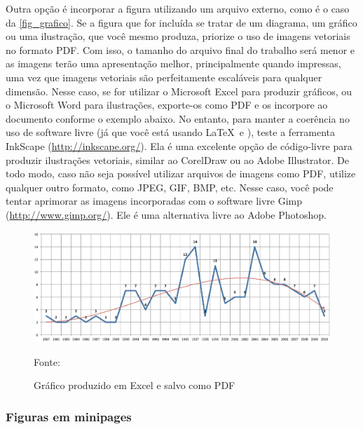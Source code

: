 Outra opção \'e incorporar a figura utilizando um arquivo externo, como \'e o caso da \autoref{fig_grafico}. Se a figura que for incluída se tratar de um diagrama, um gr\'afico ou uma ilustração, que voc\^e mesmo produza, priorize o uso de imagens vetoriais no formato PDF. Com isso, o tamanho do arquivo final do trabalho ser\'a menor e as imagens terão uma apresentação melhor, principalmente quando impressas, uma vez que imagens vetoriais são perfeitamente escal\'aveis para qualquer dimensão. Nesse caso, se for utilizar o Microsoft Excel para produzir gr\'aficos, ou o Microsoft Word para ilustrações, exporte-os como PDF e os incorpore ao documento conforme o exemplo abaixo. No entanto, para manter a
coer\^encia no uso de software livre (j\'a que voc\^e est\'a usando \LaTeX\  e \abnTeX),
teste a ferramenta \textsf{InkScape}
(\url{http://inkscape.org/}). Ela \'e uma excelente opção de código-livre para
produzir ilustrações vetoriais, similar ao CorelDraw ou ao Adobe
Illustrator. De todo modo, caso não seja possível
utilizar arquivos de imagens como PDF, utilize qualquer outro formato, como
JPEG, GIF, BMP, etc. Nesse caso, voc\^e pode tentar aprimorar as imagens
incorporadas com o software livre \textsf{Gimp}
(\url{http://www.gimp.org/}). Ele \'e uma alternativa livre ao Adobe
Photoshop. \\

\begin{figure}[H]
	\caption{\label{fig_grafico}Gr\'afico produzido em Excel e salvo como PDF}
	\includegraphics[scale=0.5]{USPSC-img/USPSC-modelo-img-grafico.pdf}
	\begin{flushleft}
		Fonte: 
	\end{flushleft}	
\end{figure}

\subsubsection{Figuras em minipages}

